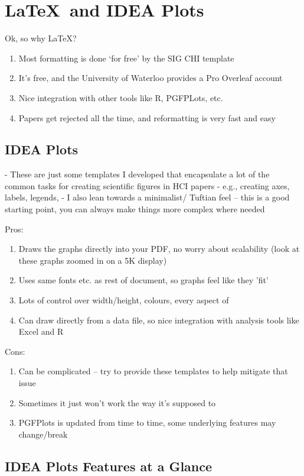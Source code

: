 \section{\LaTeX\ and IDEA Plots}

Ok, so why \LaTeX?

\begin{enumerate}
    \item Most formatting is done `for free' by the SIG CHI template
    \item It's free, and the University of Waterloo provides a Pro Overleaf account
    \item Nice integration with other tools like R, PGFPLots, etc. 
    \item Papers get rejected all the time, and reformatting is very fast and easy
\end{enumerate}





\subsection{IDEA Plots}

- These are just some templates I developed that encapsulate a lot of the common tasks for creating scientific figures in HCI papers
- e.g., creating axes, labels, legends, 
- I also lean towards a minimalist/ Tuftian feel -- this is a good starting point, you can always make things more complex where needed


Pros:
\begin{enumerate}
    \item Draws the graphs directly into your PDF, no worry about scalability (look at these graphs zoomed in on a 5K display)
    \item Uses same fonts etc. as rest of document, so graphs feel like they 'fit'
    \item Lots of control over width/height, colours, every aspect of
    \item Can draw directly from a data file, so nice integration with analysis tools like Excel and R
\end{enumerate}


Cons:
\begin{enumerate}
    \item Can be complicated -- try to provide these templates to help mitigate that issue
    \item Sometimes it just won't work the way it's supposed to
    \item PGFPlots is updated from time to time, some underlying features may change/break
\end{enumerate}


\subsection{IDEA Plots Features at a Glance}